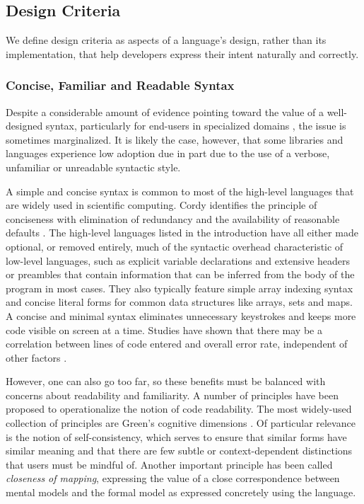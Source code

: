 \subsection{Design Criteria}
We define design criteria as aspects of a language's design, rather than its implementation, that help developers express their intent naturally and correctly.
 
\subsubsection{Concise, Familiar and Readable Syntax}\label{syntax}
Despite a considerable amount of evidence pointing toward the value of a well-designed syntax, particularly for end-users in specialized domains \cite{pane1996usability}, the issue is sometimes marginalized. It is likely the case, however, that some libraries and languages experience low adoption due in  part due to the use of a verbose, unfamiliar or unreadable syntactic style.

A simple and concise syntax is common to most of the high-level languages that are widely used in scientific computing. Cordy identifies the principle of conciseness with elimination of redundancy and the availability of reasonable defaults \cite{cordy1992hints}. The high-level languages listed in the introduction have all either made optional, or removed entirely, much of the syntactic overhead characteristic of low-level languages, such as explicit variable declarations and extensive headers or preambles that contain information that can be inferred from the body of the program in most cases. They also typically feature simple array indexing syntax and concise literal forms for common data structures like arrays, sets and maps. A concise and minimal syntax eliminates unnecessary keystrokes and keeps more code visible on screen at a time. Studies have shown that there may be a correlation between lines of code entered and overall error rate, independent of other factors \cite{el2001confounding}. 

However, one can also go too far, so these benefits must be balanced with concerns about readability and familiarity. A number of principles have been proposed to operationalize the notion of code readability. The most widely-used collection of principles are Green's cognitive dimensions \cite{green1996usability}. Of particular relevance is the notion of self-consistency, which serves to ensure that similar forms have similar meaning and that there are few subtle or context-dependent distinctions that users must be mindful of. Another important principle has been called {\it closeness of mapping}, expressing the value of a close correspondence between mental models and the formal model as expressed concretely using the language.

